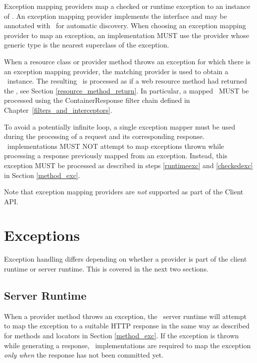 Exception mapping providers map a checked or runtime exception to an instance of \Response. An exception mapping provider implements the  interface and may be annotated with \Provider\ for automatic discovery. When choosing an exception mapping provider to map an exception, an implementation MUST use the provider whose generic type is the nearest superclass of the exception.

When a resource class or provider method throws an exception for which there is an exception mapping provider, the matching provider is used to obtain a \Response\ instance. The resulting \Response\ is processed as if a web resource method had returned the \Response, see Section \ref{resource_method_return}. In particular, a mapped \Response\ MUST be processed using the ContainerResponse filter chain defined in  Chapter~\ref{filters_and_interceptors}.

To avoid a potentially infinite loop, a single exception mapper must be used during the processing of a request and its corresponding response. \jaxrs\ implementations MUST NOT attempt to map exceptions thrown while processing a response previously mapped from an exception. Instead, this exception MUST be processed as described in steps \ref{runtimeexc} and \ref{checkedexc} in Section \ref{method_exc}.

Note that exception mapping providers are {\em not} supported as part of the Client API.

\section{Exceptions}
\label{exceptions_providers}

Exception handling differs depending on whether a provider is part of the client runtime or server runtime. This is covered in the next two sections.

\subsection{Server Runtime}
\label{exceptions_providers_server}

When a provider method throws an exception, the \jaxrs\ server runtime will attempt to map the exception to a suitable HTTP response in the same way as described for methods and locators in Section \ref{method_exc}. If the exception is thrown
while generating a response, \jaxrs\ implementations are required to map the exception {\em only when} the response has not been committed yet.

